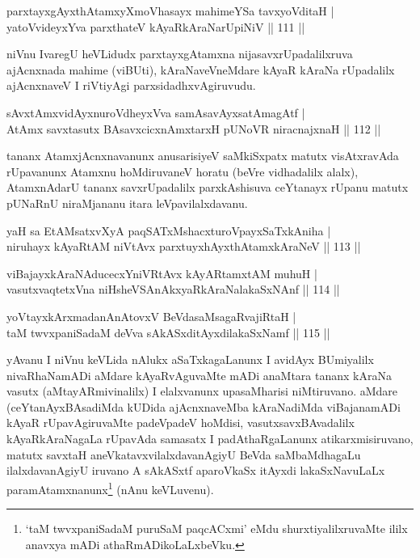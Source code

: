 \begin{shl}
parxtayxgAyxthAtamxyXmoVhasayx mahimeYSa tavxyoVditaH |\\
yatoV\s videyxYva parxthateV kAyaRkAraNarUpiNiV \hfill || 111 ||
\end{shl}

\begin{artha}%
niVnu IvaregU heVLidudx parxtayxgAtamxna nijasavxrUpadalilxruva ajAcnxnada mahime (viBUti), kAraNaveVneMdare kAyaR kAraNa rUpadalilx ajAcnxnaveV I riVtiyAgi parxsidadhxvAgiruvudu.
\end{artha}


\begin{shl}
sAvxtAmxvidAyxnuroVdheyxVva samAsavAyxsatAmagAtf |\\
AtAmx savxtasutx BAsavxcicxnAmxtarxH pUNoVR niracnajxnaH \hfill || 112 ||
\end{shl}

\begin{artha}
tananx AtamxjAcnxnavanunx anusarisiyeV saMkiSxpatx matutx visAtxravAda rUpavanunx Atamxnu hoMdiruvaneV horatu (beVre vidhadalilx alalx), AtamxnAdarU tananx savxrUpadalilx parxkAshisuva ceYtanayx rUpanu matutx pUNaRnU niraMjananu itara leVpavilalxdavanu.
\end{artha}

\begin{shl}
yaH sa EtAMsatxvXyA paqSATxMshacxturoV\s payxSaTxkAniha |\\
niruhayx kAyaRtAM niVtAvx parxtuyxhAyxthA\s \s tamxkAraNeV \hfill || 113 ||
\end{shl}

\begin{shl}
viBajayxkAraNAducecxYniVRtAvx kAyARtamxtAM muhuH |\\
vasutxvaqtetxVna niHsheVSAnAkxyaRkAraNalakaSxNAnf \hfill || 114 ||
\end{shl}

\begin{shl}
yoV\s tayxkArxmadanAnAtovxV BeVdasaMsagaRvajiRtaH |\\
taM twvxpaniSadaM deVva sAkASxditAyxdilakaSxNamf \hfill || 115 ||
\end{shl}

\begin{artha}
yAvanu I niVnu keVLida nAlukx aSaTxkagaLanunx I avidAyx BUmiyalilx nivaRhaNamADi aMdare kAyaRvAguvaMte mADi anaMtara tananx kAraNa vasutx (aMtayARmivinalilx) I elalxvanunx upasaMharisi niMtiruvano. aMdare (ceYtanAyxBAsadiMda kUDida ajAcnxnaveMba kAraNadiMda viBajanamADi kAyaR rUpavAgiruvaMte padeVpadeV hoMdisi, vasutxsavxBAvadalilx kAyaRkAraNagaLa rUpavAda samasatx I padAthaRgaLanunx atikarxmisiruvano, matutx savxtaH aneVkatavxvilalxdavanAgiyU BeVda saMbaMdhagaLu ilalxdavanAgiyU iruvano A sAkASxtf aparoVkaSx itAyxdi lakaSxNavuLaLx paramAtamxnanunx\footnote[1]{`taM twvxpaniSadaM puruSaM paqcACxmi' eMdu shurxtiyalilxruvaMte ililx anavxya mADi athaRmADikoLaLxbeVku.} (nAnu keVLuvenu).
\end{artha}%

